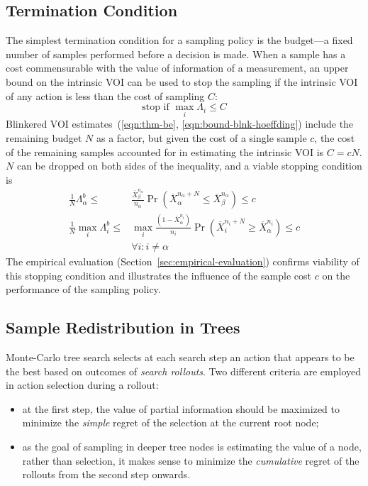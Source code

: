 \documentclass[]{article}
\begin{document}
\subsection{Termination Condition}
\label{sec:control-termination-condition}

The simplest termination condition for a sampling policy is the
budget---a fixed number of samples performed before a decision is
made. When a sample has a cost commensurable with the value of
information of a measurement, an upper bound on the intrinsic VOI can
be used to stop the sampling if the intrinsic VOI of any action
is less than the cost of sampling $C$:
\begin{equation}
\mbox{stop if } \max_i \Lambda_i \le C
\end{equation}
Blinkered VOI estimates~(\ref{eqn:thm-be},
\ref{eqn:bound-blnk-hoeffding}) include the remaining budget $N$ as a
factor, but given the cost of a single sample $c$, the cost of the
remaining samples accounted for in estimating the intrinsic VOI is
$C=cN$. $N$ can be dropped on both sides of the inequality,
and a viable stopping condition is
\begin{align}
\frac 1 N \Lambda_\alpha^b \le&\frac {\overline X_\beta^{n_\alpha}}
  {n_\alpha}\Pr(\overline X_\alpha^{n_\alpha+N}\le\overline
  X_\beta^{n_\alpha})\le c\nonumber\\
\frac 1 N \max_i\Lambda_i^b\le &\max_i\frac {(1-\overline X_\alpha^{n_i})} {n_i}\Pr(\overline
  X_i^{n_i+N}\ge\overline X_\alpha^{n_i})\le c\nonumber\\
    &\forall i: i\ne\alpha
\label{eqn:stopping-blnk}
\end{align}
The empirical evaluation (Section~\ref{sec:empirical-evaluation})
confirms viability of this stopping condition and illustrates the
influence of the sample cost $c$ on the performance of
the sampling policy.

\subsection{Sample Redistribution in Trees}
\label{sec:control-redistribution}

Monte-Carlo tree search \cite{Chaslot.montecarlo} selects at each
search step an action that appears to be the best based on outcomes
of \textit{search rollouts}. Two different criteria are employed in
action selection during a rollout:
\begin{itemize}
\item at the first step, the value of partial
information should be maximized to minimize the \textit{simple} regret
of the selection at the current root node;
\item as the goal of sampling in deeper tree nodes is estimating the
value of a node, rather than selection, it makes sense to minimize
the \textit{cumulative} regret of the rollouts from the second step
onwards.
\end{itemize}
\end{document}
